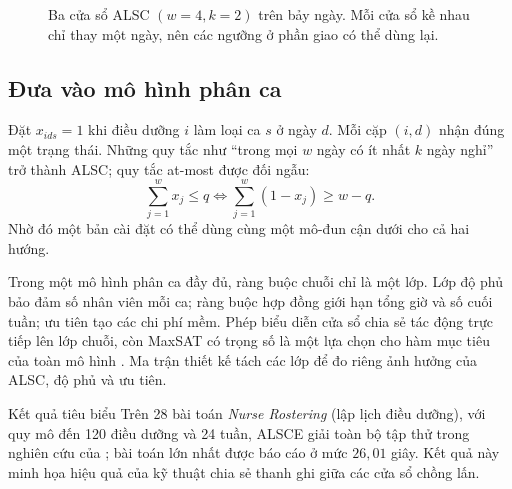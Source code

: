 \begin{figure}[tb]
\centering
{}
\caption{Ba cửa sổ ALSC \((w=4,k=2)\) trên bảy ngày. Mỗi cửa sổ kề nhau chỉ
thay một ngày, nên các ngưỡng ở phần giao có thể dùng lại.}
\label{fig:nurse-alsc}
\end{figure}

\subsection{Đưa vào mô hình phân ca}

Đặt \(x_{ids}=1\) khi điều dưỡng \(i\) làm loại ca \(s\) ở ngày \(d\). Mỗi cặp
\((i,d)\) nhận đúng một trạng thái. Những quy tắc như ``trong mọi \(w\) ngày có
ít nhất \(k\) ngày nghỉ'' trở thành ALSC; quy tắc at-most được đối ngẫu:
\[
  \sum_{j=1}^{w}x_j\le q
  \iff
  \sum_{j=1}^{w}(1-x_j)\ge w-q.
\]
Nhờ đó một bản cài đặt có thể dùng cùng một mô-đun cận dưới cho cả hai hướng.

Trong một mô hình phân ca đầy đủ, ràng buộc chuỗi chỉ là một lớp. Lớp độ phủ
bảo đảm số nhân viên mỗi ca; ràng buộc hợp đồng giới hạn tổng giờ và số cuối
tuần; ưu tiên tạo các chi phí mềm. Phép biểu diễn cửa sổ chia sẻ tác động trực
tiếp lên lớp chuỗi, còn MaxSAT có trọng số là một lựa chọn cho hàm mục tiêu của
toàn mô hình \parencite{demirovic2019staff}. Ma trận thiết kế tách các lớp để
đo riêng ảnh hưởng của ALSC, độ phủ và ưu tiên.

\begin{resultbox}{Kết quả tiêu biểu}
Trên 28 bài toán \emph{Nurse Rostering} (lập lịch điều dưỡng), với quy mô đến
120 điều dưỡng và 24 tuần,
ALSCE giải toàn bộ tập thử trong nghiên cứu của
\textcite{truong2025nurse}; bài toán lớn nhất được báo cáo ở mức
\(26{,}01\) giây. Kết quả này minh họa hiệu quả của kỹ thuật chia sẻ thanh ghi giữa
các cửa sổ chồng lấn.
\end{resultbox}

